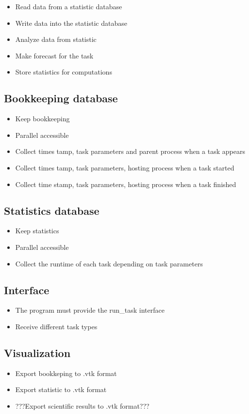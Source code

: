 {		\begin{itemize}
			\item Read data from a statistic database
			\item Write data into the statistic database
			\item Analyze data from statistic
			\item Make forecast for the task
			\item Store statistics for computations
		\end{itemize}
	
	
	\subsection{Bookkeeping database}
	
		\begin{itemize}
			\item Keep bookkeeping
			\item Parallel accessible
			\item Collect times tamp, task parameters and parent process when a task appears
			\item Collect times tamp, task parameters, hosting process when a task started
			\item Collect time stamp, task parameters, hosting process when a task finished
		\end{itemize}
	
	
	\subsection{Statistics database}
	
		\begin{itemize}
			\item Keep statistics
			\item Parallel accessible
			\item Collect the runtime of each task depending on task parameters
		\end{itemize}
	
	
	\subsection{Interface}
	
		\begin{itemize}
			\item The program must provide the run\_task interface
			\item Receive different task types
		\end{itemize}
		
		
	\subsection{Visualization}
	
		\begin{itemize}
			\item Export bookkeping to .vtk format
			\item Export statistic to .vtk format
			\item ???Export scientific results to .vtk format???
		\end{itemize}

}